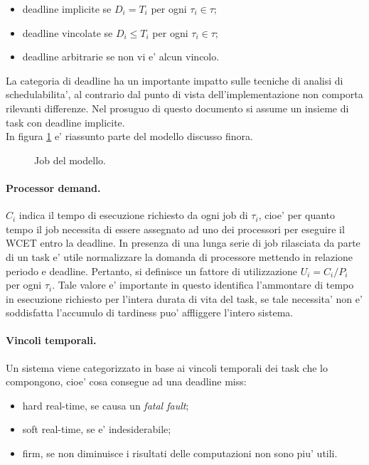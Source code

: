\begin{itemize}
	\item deadline implicite se $D_i = T_i$ per ogni $\tau_i \in \tau$;
	\item deadline vincolate se $D_i \leq T_i$ per ogni $\tau_i \in \tau$;
	\item deadline arbitrarie se non vi e' alcun vincolo.
\end{itemize}

La categoria di deadline ha un importante impatto sulle tecniche di analisi di schedulabilita', al contrario dal punto di vista dell'implementazione non comporta rilevanti differenze. Nel prosuguo di questo documento si assume un insieme di task con deadline implicite.\\

In figura \ref{fig:model_job} e' riassunto parte del modello discusso finora.

\begin{figure}
\centering
\model
\caption{Job del modello.}
\label{fig:model_job}
\end{figure}

\paragraph{Processor demand.} $C_i$ indica il tempo di esecuzione richiesto da ogni job di $\tau_i$, cioe' per quanto tempo il job necessita di essere assegnato ad uno dei processori per eseguire il WCET entro la deadline. In presenza di una lunga serie di job rilasciata da parte di un task e' utile normalizzare la domanda di processore mettendo in relazione periodo e deadline. Pertanto, si definisce un fattore di utilizzazione $U_i = C_i / P_i$ per ogni $\tau_i$. Tale valore e' importante in questo identifica l'ammontare di tempo in esecuzione richiesto per l'intera durata di vita del task, se tale necessita' non e' soddisfatta l'accumulo di tardiness puo' affliggere l'intero sistema.

\paragraph{Vincoli temporali.} Un sistema viene categorizzato in base ai vincoli temporali dei task che lo compongono, cioe' cosa consegue ad una deadline miss:
\begin{itemize}
	\item hard real-time, se causa un \textit{fatal fault};
	\item soft real-time, se e' indesiderabile;
	\item firm, se non diminuisce i risultati delle computazioni non sono piu' utili.
\end{itemize}

